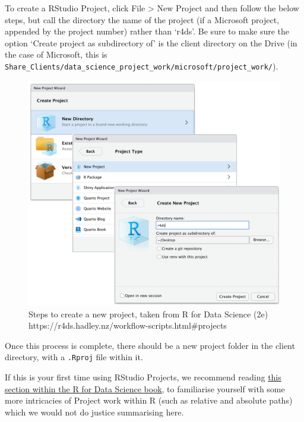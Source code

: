 \documentclass[
  letterpaper,
  DIV=11,
  numbers=noendperiod]{scrreprt}
\begin{document}
To create a RStudio Project, click File \textgreater{} New Project and
then follow the below steps, but call the directory the name of the
project (if a Microsoft project, appended by the project number) rather
than `r4ds'. Be sure to make sure the option `Create project as
subdirectory of' is the client directory on the Drive (in the case of
Microsoft, this is
\texttt{Share\_Clients/data\_science\_project\_work/microsoft/project\_work/}).

\begin{figure}[H]

{\centering \includegraphics{./img/new_project_workflow.png}

}

\caption{Steps to create a new project, taken from R for Data Science
(2e) https://r4ds.hadley.nz/workflow-scripts.html\#projects}

\end{figure}%

Once this process is complete, there should be a new project folder in
the client directory, with a \texttt{.Rproj} file within it.

If this is your first time using RStudio Projects, we recommend reading
\href{https://r4ds.hadley.nz/workflow-scripts.html\#projects}{this
section within the R for Data Science book}, to familiarise yourself
with some more intricacies of Project work within R (such as relative
and absolute paths) which we would not do justice summarising here.
\end{document}
